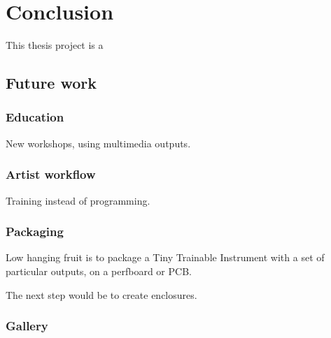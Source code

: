 \chapter{Conclusion}

This thesis project is a

\section{Future work}

\subsection{Education}

New workshops, using multimedia outputs.

\subsection{Artist workflow}

Training instead of programming.

\subsection{Packaging}

Low hanging fruit is to package a Tiny Trainable Instrument with a set of particular outputs, on a perfboard or PCB.

The next step would be to create enclosures.

\subsection{Gallery}

